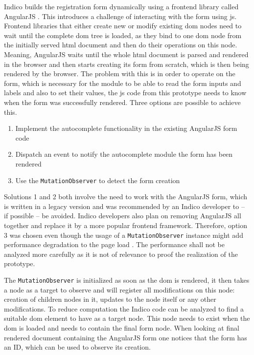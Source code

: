Indico builds the registration form dynamically using a frontend library called AngularJS \cite{angularjs}. This introduces a challenge of interacting with the form using \gls{js}. Frontend libraries that either create new or modify existing \gls{dom} nodes need to wait until the complete \gls{dom} tree is loaded, as they bind to one \gls{dom} node from the initially served \gls{html} document and then do their operations on this node. Meaning, AngularJS waits until the whole \gls{html} document is parsed and rendered in the browser and then starts creating its form from scratch, which is then being rendered by the browser. The problem with this is in order to operate on the form, which is necessary for the module to be able to read the form inputs and labels and also to set their values, the \gls{js} code from this prototype needs to know when the form was successfully rendered. Three options are possible to achieve this.

\begin{enumerate}
    \item Implement the autocomplete functionality in the existing AngularJS form code
    \item Dispatch an event to notify the autocomplete module the form has been rendered
    \item Use the \texttt{MutationObserver} to detect the form creation
\end{enumerate}

Solutions 1 and 2 both involve the need to work with the AngularJS form, which is written in a legacy version and was recommended by an Indico developer to -- if possible -- be avoided. Indico developers also plan on removing AngularJS all together and replace it by a more popular frontend framework. Therefore, option 3 was chosen even though the usage of a \texttt{MutationObserver} instance might add performance degradation to the page load \cite{dom-spec}. The performance shall not be analyzed more carefully as it is not of relevance to proof the realization of the prototype.

The \texttt{MutationObserver} is initialized as soon as the \gls{dom} is rendered, it then takes a node as a target to observe and will register all modifications on this node: creation of children nodes in it, updates to the node itself or any other modifications. To reduce computation the Indico code can be analyzed to find a suitable \gls{dom} element to have as a target node. This node needs to exist when the \gls{dom} is loaded and needs to contain the final form node. When looking at final rendered document containing the AngularJS form one notices that the form has an ID, which can be used to observe its creation.
 
